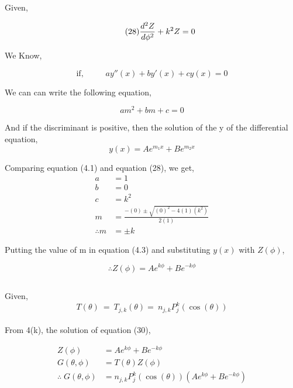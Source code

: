 \documentclass{article}
\begin{document}
\large{
Given,

\begin{equation}\tag{28}
\frac{d^2 Z}{d \phi^2} + k^2 Z= 0 \\
\end{equation}

We Know,

\begin{equation}\tag{4.1}
    \text{if, }\hspace{1cm}ay''(x) + by'(x) + cy(x) = 0
\end{equation}

We can can write the following equation,

\begin{equation}\tag{4.2}
am^2 + bm + c = 0
\end{equation}

And if the discriminant is positive, then the solution of the y of the differential equation, \\
\begin{equation}\tag{4.3}
y(x) = A e^{m_1 x} + B e^{m_2 x}
\end{equation}

Comparing equation (4.1) and equation (28), we get,
\begin{align*}
a				& = 1 \\
b				& = 0 \\
c				& = k^2 \\
m				& = \frac{-(0) \pm \sqrt{(0)^2-4(1)(k^2)}}{2(1)} \\
\therefore m	& = \pm k
\end{align*}

Putting the value of m in equation (4.3) and substituting $y(x)$ with $Z(\phi)$,

\begin{equation}\tag{4.4}
\therefore Z(\phi)	= A e^{k\phi} + B e^{-k\phi}
\end{equation}
}

\newpage

\subsection{}%

\large{
Given,
\begin{equation*}\tag{29}
T(\theta) \: = \: T_{j,k} (\theta) = \: n_{j,k} P^k_j (\cos (\theta))
\end{equation*}
\\
From 4(k), the solution of equation (30),

\begin{align*}
    Z(\phi)	& = A e^{k\phi} + B e^{-k\phi}\tag{4.4}\\
    G(\theta, \phi)		& = T(\theta) Z(\phi) \tag{25}\\
    \therefore\; G(\theta, \phi)		& = n_{j,k} P^k_j (\cos (\theta)) \left( A e^{k\phi} + B e^{-k\phi} \right) \tag{4.5}\\
\end{align*}
}
\end{document}
